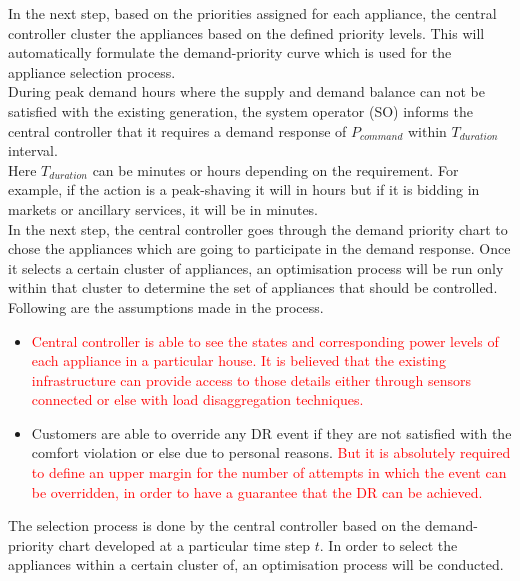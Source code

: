 \documentclass[12pt,a4paper]{article}
\begin{document}
In the next step, based on the priorities assigned for each appliance, the central controller cluster the appliances based on the defined priority levels. This will automatically formulate the demand-priority curve which is used for the appliance selection process.\\

During peak demand hours where the supply and demand balance can not be satisfied with the existing generation, the system operator (SO) informs the central controller that it requires a demand response of $P_{command}$ within $T_{duration}$ interval.\\ 

Here $T_{duration}$ can be minutes or hours depending on the requirement. For example, if the action is a peak-shaving it will in hours but if it is bidding in markets or ancillary services, it will be in minutes. \\

In the next step, the central controller goes through the demand priority chart to chose the appliances which are going to participate in the demand response. Once it selects a certain cluster of appliances, an optimisation process will be run only within that cluster to determine the set of appliances that should be controlled.\\


Following are the assumptions made in the process.
\begin{itemize}
    \item \textcolor{red}{Central controller is able to see the states and corresponding power levels of each appliance in a particular house. It is believed that the existing infrastructure can provide access to those details either through sensors connected or else with load disaggregation techniques.} 
    \item Customers are able to override any DR event if they are not satisfied with the comfort violation or else due to personal reasons. \textcolor{red}{But it is absolutely required to define an upper margin for the number of attempts in which the event can be overridden, in order to have a guarantee that the DR can be achieved.} 
\end{itemize}

The selection process is done by the central controller based on the demand-priority chart developed at a particular time step $t$. In order to select the appliances within a certain cluster of, an optimisation process will be conducted.\\
\end{document}
